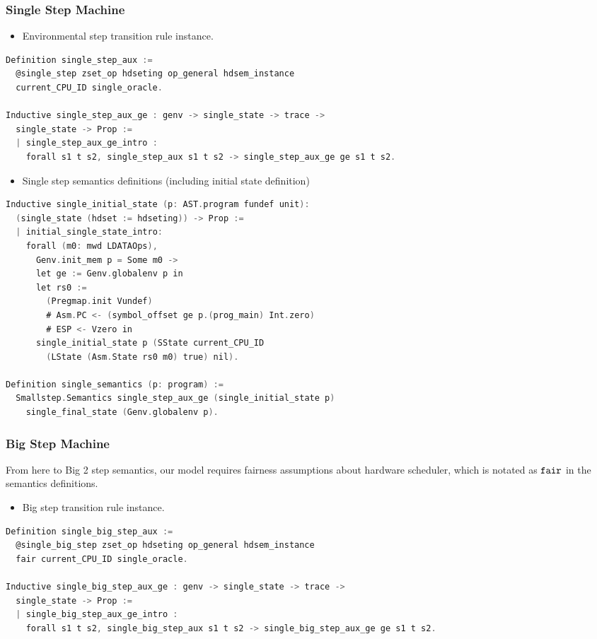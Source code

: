 \subsubsection{Single Step Machine}    
\begin{itemize}[leftmargin=*]
\item Environmental step transition rule instance.
\end{itemize}
\begin{lstlisting}[language=C]
Definition single_step_aux :=
  @single_step zset_op hdseting op_general hdsem_instance 
  current_CPU_ID single_oracle.

Inductive single_step_aux_ge : genv -> single_state -> trace -> 
  single_state -> Prop :=
  | single_step_aux_ge_intro : 
    forall s1 t s2, single_step_aux s1 t s2 -> single_step_aux_ge ge s1 t s2.
\end{lstlisting}


\begin{itemize}[leftmargin=*]
\item Single step semantics definitions (including initial state definition)
\end{itemize}
\begin{lstlisting}[language=C]
Inductive single_initial_state (p: AST.program fundef unit): 
  (single_state (hdset := hdseting)) -> Prop :=
  | initial_single_state_intro: 
    forall (m0: mwd LDATAOps),
      Genv.init_mem p = Some m0 ->
      let ge := Genv.globalenv p in
      let rs0 :=
        (Pregmap.init Vundef)
        # Asm.PC <- (symbol_offset ge p.(prog_main) Int.zero)
        # ESP <- Vzero in
      single_initial_state p (SState current_CPU_ID 
        (LState (Asm.State rs0 m0) true) nil).

Definition single_semantics (p: program) :=
  Smallstep.Semantics single_step_aux_ge (single_initial_state p) 
    single_final_state (Genv.globalenv p).
\end{lstlisting}

\subsubsection{Big Step Machine}
From here to Big 2 step semantics,
our model requires fairness assumptions about hardware scheduler, which is notated as ${\mathrm{\texttt{fair}}}$ in the semantics definitions.
\begin{itemize}[leftmargin=*]
\item Big step transition rule instance.
\end{itemize}
\begin{lstlisting}[language=C]
Definition single_big_step_aux :=
  @single_big_step zset_op hdseting op_general hdsem_instance 
  fair current_CPU_ID single_oracle.

Inductive single_big_step_aux_ge : genv -> single_state -> trace -> 
  single_state -> Prop :=
  | single_big_step_aux_ge_intro : 
    forall s1 t s2, single_big_step_aux s1 t s2 -> single_big_step_aux_ge ge s1 t s2.
\end{lstlisting}


